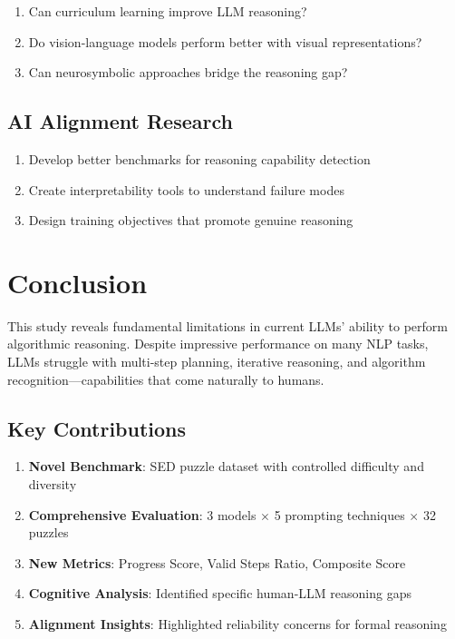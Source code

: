 \documentclass[11pt,a4paper]{article}
\begin{document}
\begin{enumerate}
    \item Can curriculum learning improve LLM reasoning?
    \item Do vision-language models perform better with visual representations?
    \item Can neurosymbolic approaches bridge the reasoning gap?
\end{enumerate}

\subsection{AI Alignment Research}

\begin{enumerate}
    \item Develop better benchmarks for reasoning capability detection
    \item Create interpretability tools to understand failure modes
    \item Design training objectives that promote genuine reasoning
\end{enumerate}

\section{Conclusion}

This study reveals fundamental limitations in current LLMs' ability to perform algorithmic reasoning. Despite impressive performance on many NLP tasks, LLMs struggle with multi-step planning, iterative reasoning, and algorithm recognition---capabilities that come naturally to humans.

\subsection{Key Contributions}

\begin{enumerate}
    \item \textbf{Novel Benchmark}: SED puzzle dataset with controlled difficulty and diversity
    \item \textbf{Comprehensive Evaluation}: 3 models $\times$ 5 prompting techniques $\times$ 32 puzzles
    \item \textbf{New Metrics}: Progress Score, Valid Steps Ratio, Composite Score
    \item \textbf{Cognitive Analysis}: Identified specific human-LLM reasoning gaps
    \item \textbf{Alignment Insights}: Highlighted reliability concerns for formal reasoning
\end{enumerate}
\end{document}
